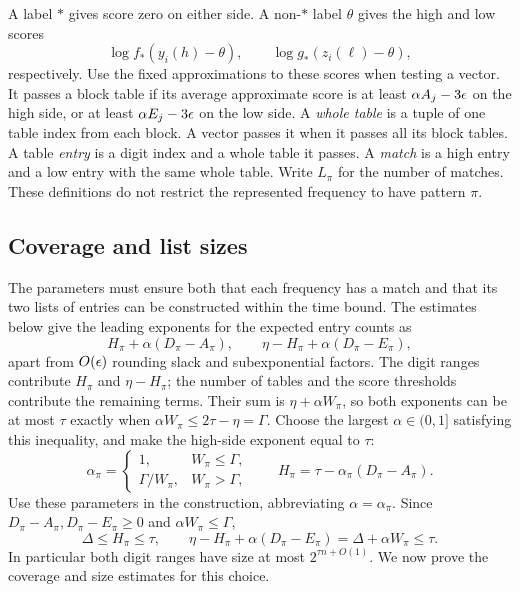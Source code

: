 A label $*$ gives score zero on either side.  A non-$*$ label $\theta$
gives the high and low scores
\[
 \log f_*(y_i(h)-\theta),\qquad
 \log g_*(z_i(\ell)-\theta),
\]
respectively.  Use the fixed approximations to these scores when
testing a vector.  It passes a block table if its average approximate
score is at least $\alpha A_j-3\epsilon$ on the high side, or at least
$\alpha E_j-3\epsilon$ on the low side.
A \emph{whole table} is a tuple of one table index from each block.
A vector passes it when it passes all its block tables.  A table
\emph{entry} is a digit index and a whole table it passes.  A
\emph{match} is a high entry and a low entry with the same whole table.
Write $L_\pi$ for the number of matches.  These definitions do not
restrict the represented frequency to have pattern $\pi$.

\subsection{Coverage and list sizes}

The parameters must ensure both that each frequency has a match and
that its two lists of entries can be constructed within the time bound.
The estimates below give the leading exponents for the expected entry
counts as
\[
 H_\pi+\alpha(D_\pi-A_\pi),\qquad
 \eta-H_\pi+\alpha(D_\pi-E_\pi),
\]
apart from $O(\epsilon)$ rounding slack and subexponential factors.  The
digit ranges contribute $H_\pi$ and $\eta-H_\pi$; the number of tables
and the score thresholds contribute the remaining terms.  Their sum
is $\eta+\alpha W_\pi$, so both exponents can be at most $\tau$
exactly when $\alpha W_\pi\le2\tau-\eta=\Gamma$.
Choose the largest $\alpha\in(0,1]$ satisfying this inequality, and
make the high-side exponent equal to $\tau$:
\begin{equation}
 \alpha_\pi=
 \begin{cases}1,&W_\pi\le\Gamma,\\
 \Gamma/W_\pi,&W_\pi>\Gamma,
 \end{cases}
 \qquad H_\pi=\tau-\alpha_\pi(D_\pi-A_\pi).
 \label{eq:checksum-alpha}
\end{equation}
Use these parameters in the construction, abbreviating
$\alpha=\alpha_\pi$.  Since
$D_\pi-A_\pi,D_\pi-E_\pi\ge0$ and $\alpha W_\pi\le\Gamma$,
\begin{equation}
 \Delta\le H_\pi\le\tau,
 \qquad
 \eta-H_\pi+\alpha(D_\pi-E_\pi)
   =\Delta+\alpha W_\pi\le\tau.
 \label{eq:checksum-digit-balance}
\end{equation}
In particular both digit ranges have size at most
$2^{\tau n+O(1)}$.  We now prove the coverage and size estimates for
this choice.

